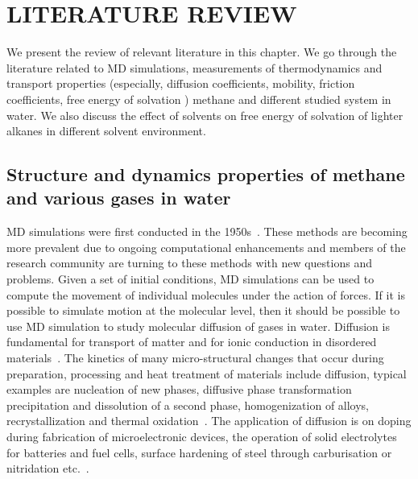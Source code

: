 \chapter{LITERATURE REVIEW} \label{chap:2}
\def\JPC{{\it J. Phys. C : Solid State Phys\ }\/}
\def\JCP{{\it J. Chem. Phys.\ }\/}
\def\JCOM{{\it J. Comput. Phys.\ }\/}
\def\JPF{{\it J. Phys. F : Metal Phys\ }\/}
\def\JPCM{{\it J. Phys. Condens Matter\ }\/}
\def\PR{{\it Phys. Rev.\ }\/}
\def\PRL{{\it Phys. Rev. Lett.\ }\/}
\def\JMMM{{\it J. Magn. Mag. Mater\ }\/}
\def\APL{{\it Appl. Phys. Lett.\ }\/}
\def\ESSL{{Electrochem. and Solid State Lett. }\/}
\def\RMP{{\it Rev. Mod. Phys.\ }\/}
\def\RPP{{\it Rep. Prog. Phys.\ }\/}


We present the review of relevant literature in this chapter. We go through the literature related to MD simulations, measurements of thermodynamics and transport properties (especially, diffusion coefficients, mobility, friction coefficients, free energy of solvation )  methane and different studied system in water. We also discuss the effect of solvents on free energy of solvation of lighter alkanes in different solvent environment.  
\section{Structure and dynamics properties of methane and various gases in water}
MD simulations were first conducted in the 1950s~\citep{Haile1992}. These methods are becoming more prevalent due to ongoing computational enhancements and members of the research community are turning to these methods with new questions and problems. Given a set of initial conditions, MD simulations can be used to compute the movement of individual molecules under the action of forces. If it is
possible to simulate motion at the molecular level, then it should be possible to use MD
simulation to study molecular diffusion of  gases in water. Diffusion is fundamental for transport of matter and for ionic conduction in disordered materials~\citep{harmandaris2007, adhikari2004}. The kinetics of many micro-structural changes that occur during preparation, processing and heat treatment of materials include diffusion, typical examples are nucleation of new phases, diffusive phase transformation precipitation and dissolution of a second phase, homogenization of alloys, recrystallization and thermal oxidation~\citep{mehrer2007}. The application of diffusion is on doping during fabrication of microelectronic devices, the operation of solid electrolytes for batteries and fuel cells, surface hardening of steel through carburisation or nitridation etc.~\citep{mehrer2009}.

